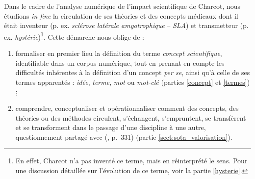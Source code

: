 

Dans le cadre de l'analyse numérique de l'impact scientifique de Charcot, nous étudions \textit{in fine} la circulation de ses théories et des concepts médicaux dont il était inventeur (p. ex. \textit{sclérose latérale amyotrophique} -- \textit{SLA}) et transmetteur (p. ex. \textit{hystérie})\footnote{En effet, Charcot n'a pas inventé ce terme, mais en réinterprété le sens. Pour une discussion détaillée sur l'évolution de ce terme, voir la partie \ref{hysterie}.}. Cette démarche nous oblige de :
\begin{enumerate}
	\item formaliser en premier lieu la définition du terme \textit{concept scientifique}, identifiable dans un corpus numérique, tout en prenant en compte les difficultés inhérentes à la définition d'un concept \textit{per se}, ainsi qu'à celle de ses termes apparentés : \textit{idée}, \textit{terme}, \textit{mot} ou \textit{mot-clé} (parties \ref{concept} et \ref{termes}) ;
	\item comprendre, conceptualiser et opérationnaliser \og{}comment des concepts, des théories ou des méthodes circulent, s'échangent, s'empruntent, se transfèrent et se transforment dans le passage d'une discipline à une autre\fg{}, questionnement partagé avec \citeauthor{landais2014frederic} (\citeyear{landais2014frederic}, p.~331) (partie \ref{sect:sota_valorisation}).
\end{enumerate}

